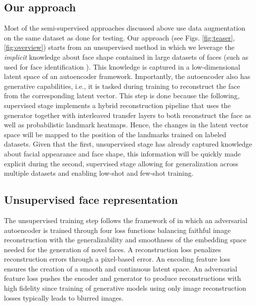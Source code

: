 \documentclass[10pt,twocolumn,letterpaper]{article}
\begin{document}
\subsection{Our approach}
Most of the semi-supervised approaches discussed above use data augmentation on the same dataset as done for testing. Our approach (see Figs. \ref{fig:teaser},\ref{fig:overview}) starts from an unsupervised method in which we leverage the {\em implicit} knowledge about face shape contained in large datasets of faces (such as used for face identification \cite{cao2018vggface2}). This knowledge is captured in a low-dimensional latent space of an autoencoder framework. Importantly, the autoencoder also has generative capabilities, i.e., it is tasked during training to reconstruct the face from the corresponding latent vector. This step is done because the following, supervised stage implements a hybrid reconstruction pipeline that uses the generator together with interleaved transfer layers to both reconstruct the face as well as probabilistic landmark heatmaps. Hence, the changes in the latent vector space will be mapped to the position of the landmarks trained on labeled datasets. Given that the first, unsupervised stage has already captured knowledge about facial appearance and face shape, this information will be quickly made explicit during the second, supervised stage allowing for generalization across multiple datasets and enabling low-shot and few-shot training.




\vspace{-0.0cm}\subsection{Unsupervised face representation}\vspace{-0.1cm} 
The unsupervised training step follows the framework of \cite{browatzki2019robust} in which an  adversarial autoencoder is trained through four loss functions  
balancing faithful image reconstruction with the generalizability and smoothness of the embedding space needed for the generation of novel faces. A reconstruction loss  penalizes reconstruction errors through a pixel-based  error. An encoding feature loss  \cite{goodfellow2014generative} ensures the creation of a smooth and continuous latent space. An adversarial feature loss   pushes the encoder  and generator  to produce reconstructions with high fidelity since training of generative models using only image reconstruction losses typically leads to blurred images. 
\end{document}
